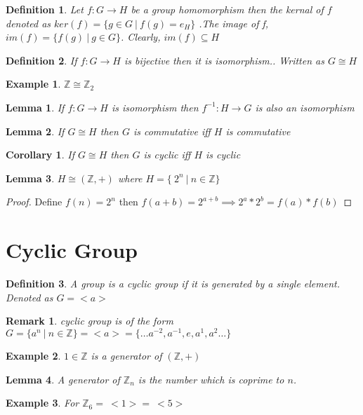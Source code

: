 \documentclass[12pt,a4paper]{article}
\newcommand{\Z}{\mathbb{Z}}
\newtheorem*{defn}{Definition}
\newtheorem*{rem}{Remark}
\newtheorem*{lem}{Lemma}
\newtheorem*{cor}{Corollary}
\newtheorem{ex}{Example}
\begin{document}
\begin{defn} \normalfont
	Let $f: G \to H$ be a group homomorphism then the kernal of $f$ denoted as
		$ker(f) = \{g\in G \:| \: f(g)=e_{H}\}$
	.The \textit{image of f}, $im(f) = \{f(g)\: | \: g\in G\}$. Clearly, $im(f) \subseteq H$
\end{defn}


\begin{defn}
\normalfont	If $f: G \to H$ is bijective then it is \textit{isomorphism.}. Written as $G \cong H$
\end{defn}
\begin{ex}
	$\Z \cong \Z_{2}$
\end{ex}
\begin{lem}
	\normalfont If $f: G \to H$ is isomorphism then $f^{-1}: H \to G$ is also an isomorphism
\end{lem}
\begin{lem}
	\normalfont If $G \cong H$ then $G$ is commutative iff $H$ is commutative
\end{lem}
\begin{cor}
	\normalfont If $G \cong H$ then $G$ is cyclic iff $H$ is cyclic
\end{cor}
\begin{lem}
	\normalfont $H \cong (\Z, +)$ where $H =  \{\ 2^n \: | \: n \in \Z \}$
\end{lem}
\begin{proof}
	Define $f(n) = 2^n$ then $f(a+b) = 2^{a+b} \implies 2^a * 2^b = f(a)*f(b)$
\end{proof}



\section{Cyclic Group}

\begin{defn}\normalfont
	A group is a \textit{cyclic group} if it is generated by a single element. Denoted as $G = <a>$
\end{defn}

\begin{rem}
	cyclic group is of the form $G=\{a^n \: |\: n\in \Z\} = <a> = \{\dots a^{-2},a^{-1},e,a^{1},a^{2}\dots \}$
\end{rem}

\begin{ex}
	$1 \in \Z$ is a generator of $(\Z, +)$
\end{ex}
\begin{lem}\normalfont
	A generator of $\Z_{n}$ is the number which is coprime to $n$.
\end{lem}
\begin{ex}
	For $\Z_{6} =\: <1> = \:<5>$
\end{ex}
\end{document}
